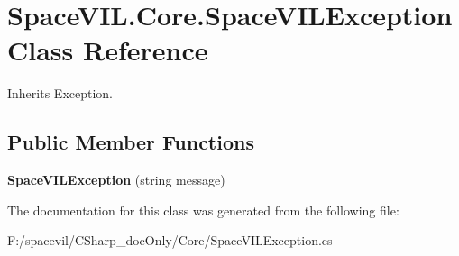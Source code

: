\hypertarget{class_space_v_i_l_1_1_core_1_1_space_v_i_l_exception}{}\section{Space\+V\+I\+L.\+Core.\+Space\+V\+I\+L\+Exception Class Reference}
\label{class_space_v_i_l_1_1_core_1_1_space_v_i_l_exception}


Inherits Exception.

\subsection*{Public Member Functions}
\begin{DoxyCompactItemize}
\item 
\mbox{\label{class_space_v_i_l_1_1_core_1_1_space_v_i_l_exception_a72d073e6629374861f5afe9d3c446ad0}} 
{\bfseries Space\+V\+I\+L\+Exception} (string message)
\end{DoxyCompactItemize}


The documentation for this class was generated from the following file\+:\begin{DoxyCompactItemize}
\item 
F\+:/spacevil/\+C\+Sharp\+\_\+doc\+Only/\+Core/Space\+V\+I\+L\+Exception.\+cs\end{DoxyCompactItemize}
